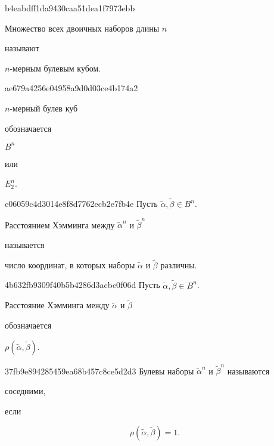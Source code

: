 \begin{note}{b4eabdff1da9430caa51dea1f7973ebb}
    \begin{icloze}{2}Множество всех двоичных наборов длины \({ n }\)\end{icloze} называют \begin{icloze}{1}\({ n }\)-мерным булевым кубом.\end{icloze}
\end{note}

\begin{note}{ae679a4256e04958a9d0d03ce4b174a2}
    \begin{icloze}{2}\({ n }\)-мерный булев куб\end{icloze} обозначается \begin{icloze}{1}\({ B^{n} }\)\end{icloze} или \begin{icloze}{1}\({ E_2^{n} }\).\end{icloze}
\end{note}

\begin{note}{c06059c4d3014e8f8d7762ecb2e7fb4e}
    Пусть \({ \widetilde \alpha, \widetilde \beta \in B^{n} }\).
    \begin{icloze}{2}Расстоянием Хэмминга между \({ \widetilde \alpha^{n} }\) и \({ \widetilde \beta^{n} }\)\end{icloze} называется
    \begin{icloze}{1}число координат, в которых наборы \({ \widetilde \alpha }\) и \({ \widetilde \beta }\) различны.\end{icloze}
\end{note}

\begin{note}{4b632fb9309f40b5b4286d3acbc0f06d}
    Пусть \({ \widetilde \alpha, \widetilde \beta \in B^{n} }\).
    \begin{icloze}{2}Расстояние Хэмминга между \({ \widetilde \alpha }\) и \({ \widetilde \beta }\)\end{icloze} обозначается \begin{icloze}{1}\({ \rho(\widetilde \alpha, \widetilde \beta) }\).\end{icloze}
\end{note}

\begin{note}{37fb9e894285459ea68b457c8ce5d2d3}
    Булевы наборы \({ \widetilde \alpha^{n} }\) и \({ \widetilde \beta^{n} }\) называются \begin{icloze}{2}соседними,\end{icloze} если
    \begin{icloze}{1}
        \[
            \rho(\widetilde \alpha, \widetilde \beta) = 1.
        \]
    \end{icloze}
\end{note}

